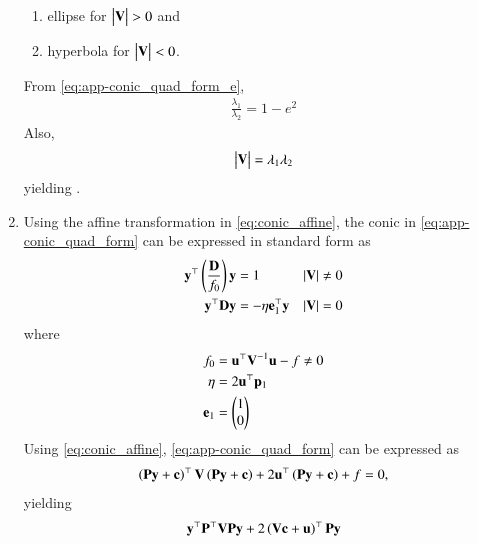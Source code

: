 \begin{enumerate}[label=\thesubsection.\arabic*.,ref=\thesubsection.\theenumi]
\begin{enumerate}
		\item ellipse for $\begin{vmatrix}\mathbf{V}\end{vmatrix} > 0 $ and 
		\item hyperbola for $\begin{vmatrix}\mathbf{V}\end{vmatrix} < 0 $.
	\end{enumerate}
\solution
  From \eqref{eq:app-conic_quad_form_e},
\begin{align}
  \frac{\lambda_1}{\lambda_2} = 1 - e^2
\end{align}
Also, 
\begin{align}
	\begin{vmatrix}\mathbf{V}\end{vmatrix} =   \lambda_1\lambda_2 
\end{align}
	yielding .
\begin{table}[!h]
\centering
\resizebox{\columnwidth}{!}{%

	}
	\caption{}
\label{table:det}
\end{table}
			\item Using the affine transformation in
					\label{app:std-prm-P}
	\eqref{eq:conic_affine},
	the conic in     \eqref{eq:app-conic_quad_form} can be expressed in standard form 
	as
  \begin{align}
    \label{eq:app-conic_simp_temp_nonparab}
	    \mathbf{y}^{\top}\left(\frac{\mathbf{D}}{f_0}\right)\mathbf{y} &= 1   &  \left\vert\mathbf{V}\right\vert &\ne 0
    \\
	    \mathbf{y}^{\top}\mathbf{D}\mathbf{y} &=  -\eta\mathbf{e}_1^{\top}\mathbf{y}   & \left\vert\mathbf{V}\right\vert &= 0
    \label{eq:app-conic_simp_temp_parab}
    \end{align}
    where
  \begin{align}
      \label{eq:app-f0}
	  f_0 &=\mathbf{u}^{\top}\mathbf{V}^{-1}\mathbf{u} -f \ne 0
	  \\
      \label{eq:app-eta}
       \eta &=2\mathbf{u}^{\top}\mathbf{p}_1
       \\
       \mathbf{e}_1 &=\begin{pmatrix}1 \\ 0\end{pmatrix}
      \end{align}
      \solution
  \label{app:parab}
	Using 
\eqref{eq:conic_affine},
\eqref{eq:app-conic_quad_form} can be expressed as
\begin{align}
\left(\mathbf{P}\mathbf{y}+\mathbf{c}\right)^{\top}\mathbf{V}\left(\mathbf{P}\mathbf{y}+\mathbf{c}\right)+2\mathbf{u}^{\top}\left(\mathbf{P}\mathbf{y}+\mathbf{c}\right)+ f
	= 0, 
\end{align}
yielding 
\begin{align}
\vec{y}^{\top}\vec{P}^{\top}\vec{V}\vec{P}\vec{y}+2\brak{\vec{V}\vec{c}+\vec{u}}^{\top}\vec{P}\vec{y}

\end{align}
\end{enumerate}
